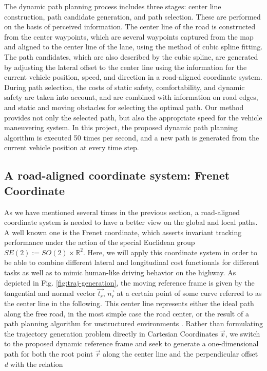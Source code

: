 The dynamic path planning process includes three stages: center line construction, path candidate generation, and path selection. These are performed on the basis of perceived information. The center line of the road is constructed from the center waypoints, which are several waypoints captured from the map and aligned to the center line of the lane, using the method of cubic spline fitting. The path candidates, which are also described by the cubic spline, are generated by adjusting the lateral offset to the center line using the information for the current vehicle position, speed, and direction in a road-aligned coordinate system. During path selection, the costs of static safety, comfortability, and dynamic safety are taken into account, and are combined with information on road edges, and static and moving obstacles for selecting the optimal path. Our method provides not only the selected path, but also the appropriate speed for the vehicle maneuvering system. In this project, the proposed dynamic path planning algorithm is executed 50 times per second, and a new path is generated from the current vehicle position at every time step. 

\subsection{A road-aligned coordinate system: Frenet Coordinate}

As we have mentioned several times in the previous section, a road-aligned coordinate system is needed to have a better view on the global and local paths. A well known one is the Frenet coordinate, which asserts invariant tracking performance under the action of the special Euclidean group $SE(2) := SO(2) \times \mathbb{R}^2$. Here, we will apply this coordinate system in order to be able to combine different lateral and longitudinal cost functionals for different tasks as well as to mimic human-like driving behavior on the highway. As depicted in Fig. \ref{fig:traj-generation}, the moving reference frame is given by the tangential and normal vector $\overrightarrow{t_r}$, $\overrightarrow{n_r}$ at a certain point of some curve referred to as the center line in the following. This center line represents either the ideal path along the free road, in the most simple case the road center, or the result of a path planning algorithm for unstructured environments \cite{Frenet2008}. Rather than formulating the trajectory generation problem directly in Cartesian Coordinates $\overrightarrow{x}$, we switch to the proposed dynamic reference frame and seek to generate a one-dimensional path for both the root point $\overrightarrow{r}$ along the center line and the perpendicular offset \textit{d} with the relation

